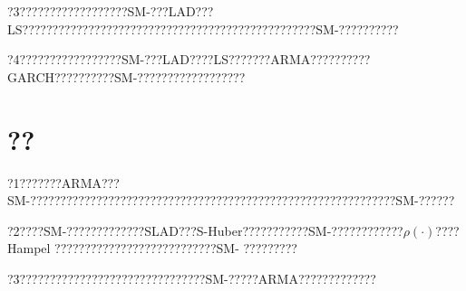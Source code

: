 \documentclass[a4paper,12pt,openany,oneside,utf-8]{ctexbook}
\begin{document}
	?3??????????????????SM-???LAD???LS?????????????????????????????????????????????????SM-??????????
	
	?4?????????????????SM-???LAD????LS???????ARMA??????????GARCH??????????SM-??????????????????
	
	\section{??}
	
	?1???????ARMA???SM-?????????????????????????????????????????????????????????????SM-??????
	
	?2????SM-?????????????SLAD???S-Huber???????????SM-????????????$\rho(\cdot)$????Hampel ???????????????????????????SM- ?????????
	
	?3???????????????????????????????SM-?????ARMA?????????????
	
	
	
	
	
\end{document}
